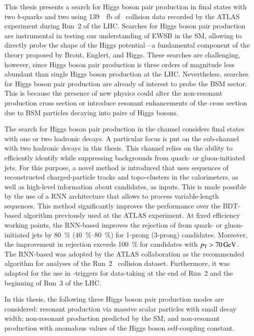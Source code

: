 This thesis presents a search for Higgs boson pair production in final states
with two $b$-quarks and two \tauleptons using \SI{139}{\per\femto\barn} of
\pp~collision data recorded by the ATLAS experiment during Run~2 of the
LHC. Searches for Higgs boson pair production are instrumental in testing our
understanding of EWSB in the SM, allowing to directly probe the shape of the
Higgs potential---a fundamental component of the theory proposed by Brout,
Englert, and Higgs. These searches are challenging, however, since Higgs boson
pair production is three orders of magnitude less abundant than single Higgs
boson production at the LHC. Nevertheless, searches for Higgs boson pair
production are already of interest to probe the BSM sector. This is because the
presence of new physics could alter the non-resonant \HH production cross
section or introduce resonant enhancements of the cross section due to BSM
particles decaying into pairs of Higgs bosons.


The search for Higgs boson pair production in the \bbtautau channel considers
final states with one or two hadronic \taulepton decays. A particular focus is
put on the sub-channel with two hadronic \taulepton decays in this thesis. This
channel relies on the ability to efficiently identify \tauhadvis while
suppressing backgrounds from quark- or gluon-initiated jets. For this purpose, a
novel \tauid method is introduced that uses sequences of reconstructed
charged-particle tracks and topo-clusters in the calorimeters, as well as
high-level information about \tauhadvis candidates, as inputs. This is made
possible by the use of a RNN architecture that allows to process variable-length
sequences. This method significantly improves the \tauid performance over the
BDT-based algorithm previously used at the ATLAS experiment. At fixed \tauhadvis
efficiency working points, the RNN-based \tauid improves the rejection of
\faketauhadvis from quark- or gluon-initiated jets by \SI{80}{\percent}
(\SIrange{40}{80}{\percent}) for 1-prong (3-prong) \tauhadvis
candidates. Moreover, the improvement in \faketauhadvis rejection exceeds
\SI{100}{\percent} for candidates with $\pT > \SI{70}{\GeV}$. The RNN-based
\tauid was adopted by the ATLAS collaboration as the recommended \tauid
algorithm for analyses of the Run~2 \pp~collision dataset. Furthermore, it was
adapted for the use in \tauhadvis-triggers for data-taking at the end of Run~2
and the beginning of Run~3 of the LHC.


In this thesis, the following three Higgs boson pair production modes are
considered: resonant \HH production via massive scalar particles with small
decay width; non-resonant \HH production predicted by the SM; and non-resonant
\HH production with anomalous values of the Higgs boson self-coupling constant.


